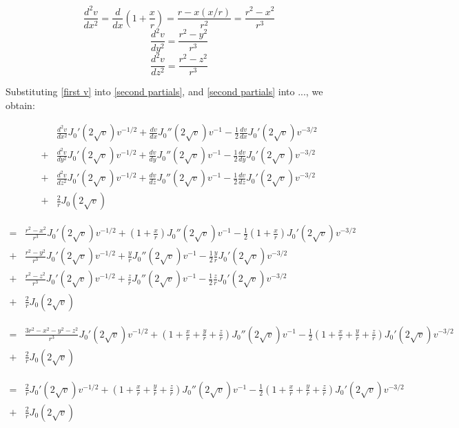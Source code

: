 \documentclass{article}
\begin{document}
\vskip 20pt

\begin{equation}
\frac{d^2 v}{d x^2} = \frac{d}{d x} \left(1 + \frac{x}{r}\right) = \frac{r - x(x/r)}{r^2} = \frac{r^2 - x^2}{r^3}
\end{equation}
\begin{equation}
\frac{d^2 v}{d y^2} = \frac{r^2 - y^2}{r^3}
\end{equation}
\begin{equation}
\frac{d^2 v}{d z^2} = \frac{r^2 - z^2}{r^3}
\end{equation}

\vskip 20pt

Substituting \eqref{first v} into \eqref{second partials}, and \eqref{second partials} into ..., we obtain:

\begin{equation}
\begin{aligned}
&\frac{d^2 v}{d x^2} J_0'(2\sqrt{v}) v^{-1/2} + \frac{d v}{d x} J_0''(2\sqrt{v}) v^{-1} - \frac{1}{2} \frac{d v}{d x} J_0'(2\sqrt{v}) v^{-3/2} \\
+& \frac{d^2 v}{d y^2} J_0'(2\sqrt{v}) v^{-1/2} + \frac{d v}{d y} J_0''(2\sqrt{v}) v^{-1} - \frac{1}{2} \frac{d v}{d y} J_0'(2\sqrt{v}) v^{-3/2} \\
+& \frac{d^2 v}{d z^2} J_0'(2\sqrt{v}) v^{-1/2} + \frac{d v}{d z} J_0''(2\sqrt{v}) v^{-1} - \frac{1}{2} \frac{d v}{d z} J_0'(2\sqrt{v}) v^{-3/2} \\
+& \frac{2}{r} J_0(2\sqrt{v})
\end{aligned}
\end{equation}

\begin{equation}
\begin{aligned}
=&\frac{r^2-x^2}{r^3} J_0'(2\sqrt{v}) v^{-1/2} + (1+\frac{x}{r}) J_0''(2\sqrt{v}) v^{-1} - \frac{1}{2} (1+\frac{x}{r}) J_0'(2\sqrt{v}) v^{-3/2} \\
+& \frac{r^2-y^2}{r^3} J_0'(2\sqrt{v}) v^{-1/2} + \frac{y}{r} J_0''(2\sqrt{v}) v^{-1} - \frac{1}{2} \frac{y}{r} J_0'(2\sqrt{v}) v^{-3/2} \\
+& \frac{r^2-z^2}{r^3} J_0'(2\sqrt{v}) v^{-1/2} + \frac{z}{r} J_0''(2\sqrt{v}) v^{-1} - \frac{1}{2} \frac{z}{r} J_0'(2\sqrt{v}) v^{-3/2} \\
+& \frac{2}{r} J_0(2\sqrt{v})
\end{aligned}
\end{equation}

\begin{equation}
\begin{aligned}
=&\frac{3r^2-x^2-y^2-z^2}{r^3} J_0'(2\sqrt{v}) v^{-1/2} + (1+\frac{x}{r} + \frac{y}{r} + \frac{z}{r}) J_0''(2\sqrt{v}) v^{-1} - \frac{1}{2} (1+\frac{x}{r} + \frac{y}{r} + \frac{z}{r}) J_0'(2\sqrt{v}) v^{-3/2} \\
+& \frac{2}{r} J_0(2\sqrt{v})
\end{aligned}
\end{equation}

\begin{equation}
\begin{aligned}
=&\frac{2}{r} J_0'(2\sqrt{v}) v^{-1/2} + (1+\frac{x}{r} + \frac{y}{r} + \frac{z}{r}) J_0''(2\sqrt{v}) v^{-1} - \frac{1}{2} (1+\frac{x}{r} + \frac{y}{r} + \frac{z}{r}) J_0'(2\sqrt{v}) v^{-3/2} \\
+& \frac{2}{r} J_0(2\sqrt{v})
\end{aligned}
\end{equation}
\end{document}
